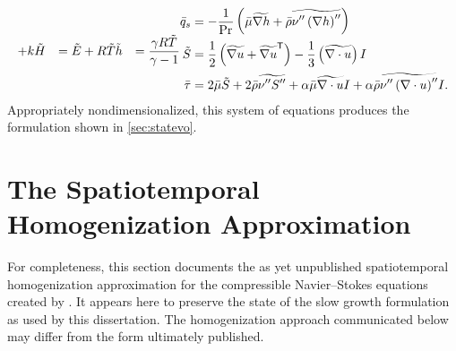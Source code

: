 \begin{subequations}
\begin{align}
+ k
&
  \tilde{H}
&=
  \tilde{E}
+ R \tilde{T}
&
  \tilde{h} &= \frac{\gamma{}R\tilde{T}}{\gamma-1}
\end{align}
\begin{align}
  \bar{q}_s
&= - \frac{1}{\Prandtl}\left(
                \bar{\mu}\widetilde{\nabla{}h}
              + \bar{\rho} \widetilde{\nu''\left(\nabla{}h\right)''}
            \right)
\\
   \tilde{S}
&=
     \frac{1}{2}\left(
       \widetilde{\nabla{}u} + \trans{\widetilde{\nabla{}u}}
     \right)
   - \frac{1}{3}\left(\widetilde{\nabla\cdot{}u}\right) I
\\
   \bar{\tau}
&=  2 \bar{\mu}\tilde{S}
  + 2 \bar{\rho} \widetilde{\nu''S''}
  + \alpha \bar{\mu} \widetilde{\nabla\cdot{}u} I
  + \alpha \bar{\rho} \widetilde{\nu''\left(\nabla\cdot{}u\right)''} I.
\end{align}
\end{subequations}
Appropriately nondimensionalized, this system of equations produces the
formulation shown in \autoref{sec:statevo}.

\section{The Spatiotemporal Homogenization Approximation}
\label{sec:slowgrowthmodels}

For completeness, this section documents the as yet unpublished spatiotemporal
homogenization approximation for the compressible Navier--Stokes equations
created by \citet{Topalian2014Spatiotemporal}.  It appears here to preserve the
state of the slow growth formulation as used by this dissertation.  
The homogenization approach communicated below may differ from the
form ultimately published.

